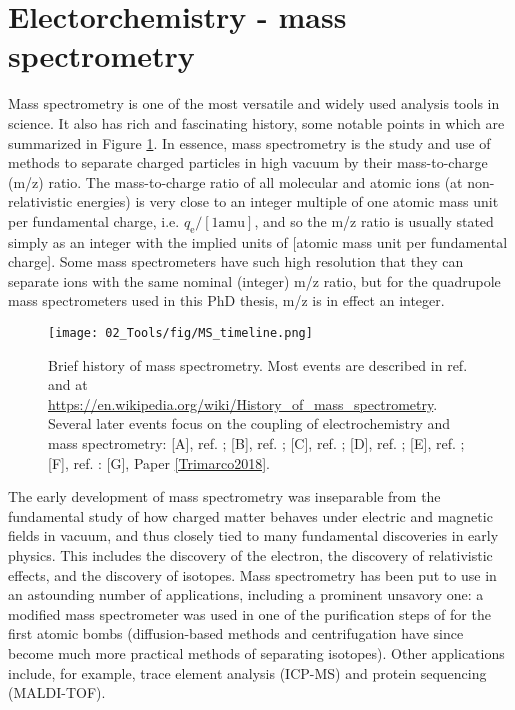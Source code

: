 \section{Electorchemistry - mass spectrometry}\label{sec:ECMS}

Mass spectrometry is one of the most versatile and widely used analysis tools in science\cite{Gross2007, Harris2010}. It also has rich and fascinating history\cite{Griffiths2008}, some notable points in which are summarized in Figure \ref{fig:MS_timeline}. In essence, mass spectrometry is the study and use of methods to separate charged particles in high vacuum by their mass-to-charge (m/z) ratio. The mass-to-charge ratio of  all molecular and atomic ions (at non-relativistic energies) is very close to an integer multiple of one atomic mass unit per fundamental charge, i.e. $q_\text{e}/[1 \text{amu}]$, and so the m/z ratio is usually stated simply as an integer with the implied units of [atomic mass unit per fundamental charge]. Some mass spectrometers have such high resolution that they can separate ions with the same nominal (integer) m/z ratio\cite{Gross2007}, but for the quadrupole mass spectrometers used in this PhD thesis, m/z is in effect an integer.

\begin{figure}[h!]
	\centering
	\texttt{[image: 02\_Tools/fig/MS\_timeline.png]}
	\caption{Brief history of mass spectrometry. Most events are described in ref.  and at \url{https://en.wikipedia.org/wiki/History_of_mass_spectrometry}. Several later events focus on the coupling of electrochemistry and mass spectrometry: [A], ref. ; [B], ref. ; [C], ref. ; [D], ref. ; [E], ref. ; [F], ref. : [G], Paper \ref{Trimarco2018}.}
	\label{fig:MS_timeline}
\end{figure}

The early development of mass spectrometry was inseparable from the fundamental study of how charged matter behaves under electric and magnetic fields in vacuum, and thus closely tied to many fundamental discoveries in early physics. This includes the discovery of the electron, the discovery of relativistic effects, and the discovery of isotopes. Mass spectrometry has been put to use in an astounding number of applications, including a prominent unsavory one: a modified mass spectrometer was used in one of the purification steps of  for the first atomic bombs (diffusion-based methods and centrifugation have since become much more practical methods of separating isotopes)\cite{Hewlett1962}. Other applications include, for example, trace element analysis (ICP-MS) and protein sequencing (MALDI-TOF).

